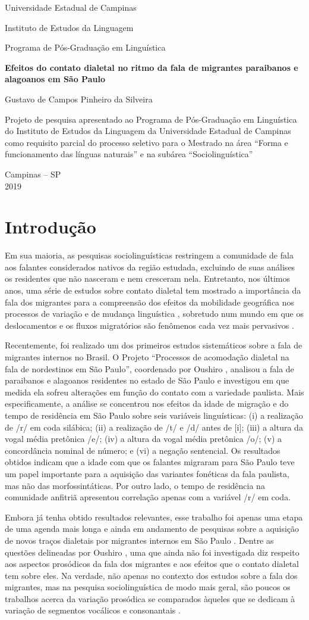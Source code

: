 \documentclass[a4paper, 12pt, article, oneside, brazil,leqno]{memoir}
\newcommand*\folhaderosto{
\begin{center}
      \thispagestyle{empty}
      \setcounter{page}{0}
      {\large Universidade Estadual de Campinas}
      \par
      {\large Instituto de Estudos da Linguagem}
      \par
      {\large Programa de Pós-Graduação em Linguística}

      \vspace*{\fill}\vspace*{\fill}
      \begin{center}
      {\Large\bfseries Efeitos do contato dialetal no ritmo da fala de migrantes paraibanos e alagoanos em São Paulo}
\end{center}

      {\large Gustavo de Campos Pinheiro da Silveira}

      \vspace*{\fill}

      {\hspace{.45\textwidth}
      \begin{minipage}{.5\textwidth}
            \SingleSpacing
            Projeto de pesquisa apresentado ao Programa de Pós-Graduação em Linguística do Instituto de Estudos da Linguagem da Universidade Estadual de Campinas como requisito parcial do processo seletivo para o Mestrado na área “Forma e funcionamento das línguas naturais” e na subárea “Sociolinguística”
      \end{minipage}
      \vspace*{\fill}}


      {\large Campinas -- SP} \\
      {\large 2019}
      \vspace*{.5cm}
\end{center}

}
\begin{document}
\folhaderosto

\chapter{Introdução}

Em sua maioria, as pesquisas sociolinguísticas restringem a comunidade de fala aos falantes considerados nativos da região estudada, excluindo de suas análises os residentes que não nasceram e nem cresceram nela. Entretanto, nos últimos anos, uma série de estudos sobre contato dialetal tem mostrado a importância da fala dos migrantes para a compreensão dos efeitos da mobilidade geográfica nos processos de variação e de mudança linguística \cite{milroy2002}, sobretudo num mundo em que os deslocamentos e os fluxos migratórios são fenômenos cada vez mais pervasivos \cite{internationalorganizationformigration2018}.

Recentemente, foi realizado um dos primeiros estudos sistemáticos sobre a fala de migrantes internos no Brasil. O Projeto \enquote{Processos de acomodação dialetal na fala de nordestinos em São Paulo}, coordenado por Oushiro \citeyear{oushiro2018}, analisou a fala de paraibanos e alagoanos residentes no estado de São Paulo e investigou em que medida ela sofreu alterações em função do contato com a variedade paulista. Mais especificamente, a análise se concentrou nos efeitos da idade de migração e do tempo de residência em São Paulo sobre seis variáveis linguísticas: (i) a realização de /r/ em coda silábica; (ii) a realização de /t/ e /d/ antes de [i]; (iii) a altura da vogal média pretônica /e/; (iv) a altura da vogal média pretônica /o/; (v) a concordância nominal de número; e (vi) a negação sentencial. Os resultados obtidos indicam que a idade com que os falantes migraram para São Paulo teve um papel importante para a aquisição das variantes fonéticas da fala paulista, mas não das morfossintáticas. Por outro lado, o tempo de residência na comunidade anfitriã apresentou correlação apenas com a variável /r/ em coda.

Embora já tenha obtido resultados relevantes, esse trabalho foi apenas uma etapa de uma agenda mais longa e ainda em andamento de pesquisas sobre a aquisição de novos traços dialetais por migrantes internos em São Paulo \cite{oushiro2018}. Dentre as questões delineadas por Oushiro \citeyear{oushiro2018}, uma que ainda não foi investigada diz respeito aos aspectos prosódicos da fala dos migrantes e aos efeitos que o contato dialetal tem sobre eles. Na verdade, não apenas no contexto dos estudos sobre a fala dos migrantes, mas na pesquisa sociolinguística de modo mais geral, são poucos os trabalhos acerca da variação prosódica se comparados àqueles que se dedicam à variação de segmentos vocálicos e consonantais \cite{thomas2013}.
\end{document}
